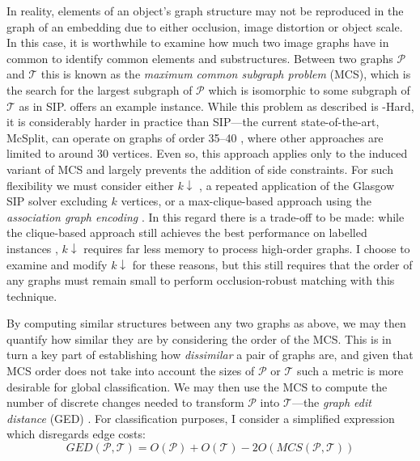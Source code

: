 \documentclass{mpaper}
\begin{document}
In reality, elements of an object's graph structure may not be reproduced in the graph of an embedding due to either occlusion, image distortion or object scale.
In this case, it is worthwhile to examine how much two image graphs have in common to identify common elements and substructures.
Between two graphs $\mathcal{P}$ and $\mathcal{T}$ this is known as the \emph{maximum common subgraph problem} (MCS), which is the search for the largest subgraph of $\mathcal{P}$ which is isomorphic to some subgraph of $\mathcal{T}$ as in SIP.
 offers an example instance.
While this problem as described is \NP-Hard, it is considerably harder in practice than SIP---the current state-of-the-art, McSplit, can operate on graphs of order 35--40 \cite{MCS-McSplit}, where other approaches are limited to around 30 vertices.
Even so, this approach applies only to the induced variant of MCS and largely prevents the addition of side constraints.
For such flexibility we must consider either $k\downarrow$ \cite{Between-MCS-SIP}, a repeated application of the Glasgow SIP solver excluding $k$ vertices, or a max-clique-based approach using the \emph{association graph encoding} \cite{MCS-Clique-CP}.
In this regard there is a trade-off to be made: while the clique-based approach still achieves the best performance on labelled instances \cite{MCS-McSplit}, $k\downarrow$ requires far less memory to process high-order graphs.
I choose to examine and modify $k\downarrow$ for these reasons, but this still requires that the order of any graphs must remain small to perform occlusion-robust matching with this technique.

By computing similar structures between any two graphs as above, we may then quantify how similar they are by considering the order of the MCS.
This is in turn a key part of establishing how \emph{dissimilar} a pair of graphs are, and given that MCS order does not take into account the sizes of $\mathcal{P}$ or $\mathcal{T}$ such a metric is more desirable for global classification.
We may then use the MCS to compute the number of discrete changes needed to transform $\mathcal{P}$ into $\mathcal{T}$---the \emph{graph edit distance} (GED) \cite{GraphEditDist-MCS}.
For classification purposes, I consider a simplified expression which disregards edge costs:
$$ GED(\mathcal{P}, \mathcal{T}) = O(\mathcal{P}) + O(\mathcal{T}) - 2 O(MCS(\mathcal{P}, \mathcal{T})) $$
\end{document}

